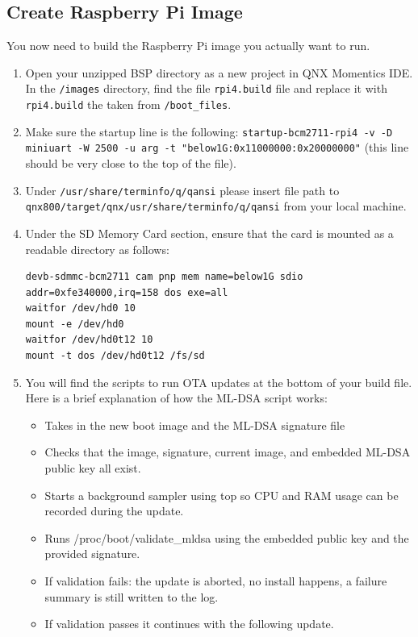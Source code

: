 \documentclass[12pt]{article}
\begin{document}
\subsection{Create Raspberry Pi Image }
You now need to build the Raspberry Pi image you actually want to run.
\begin{enumerate}
    \item Open your unzipped BSP directory as a new project in QNX Momentics IDE. In the \texttt{/images} directory, find the file \texttt{rpi4.build} file and replace it with \texttt{rpi4.build} the taken from \texttt{/boot\_files}.
    
    \item Make sure the startup line is the following: \texttt{startup-bcm2711-rpi4 -v -D miniuart -W 2500 -u arg -t "below1G:0x11000000:0x20000000"} (this line should be very close to the top of the file).
    \item Under \texttt{/usr/share/terminfo/q/qansi} please insert file path to \newline \texttt{qnx800/target/qnx/usr/share/terminfo/q/qansi} from your local machine. 
    \item Under the SD Memory Card section, ensure that the card is mounted as a readable directory as follows:
    \begin{verbatim}
devb-sdmmc-bcm2711 cam pnp mem name=below1G sdio addr=0xfe340000,irq=158 dos exe=all
waitfor /dev/hd0 10
mount -e /dev/hd0
waitfor /dev/hd0t12 10
mount -t dos /dev/hd0t12 /fs/sd
    \end{verbatim}
    \item You will find the scripts to run OTA updates at the bottom of your build file.
    Here is a brief explanation of how the ML-DSA script works:
    \begin{itemize}
        \item Takes in the new boot image and the ML-DSA signature file
        \item Checks that the image, signature, current image, and embedded ML-DSA public key all exist.
        \item Starts a background sampler using top so CPU and RAM usage can be recorded during the update.
        \item Runs /proc/boot/validate\_mldsa using the embedded public key and the provided signature.
        \item If validation fails: the update is aborted, no install happens, a failure summary is still written to the log.
        \item If validation passes it continues with the following update. 

\end{itemize}
\end{enumerate}
\end{document}
